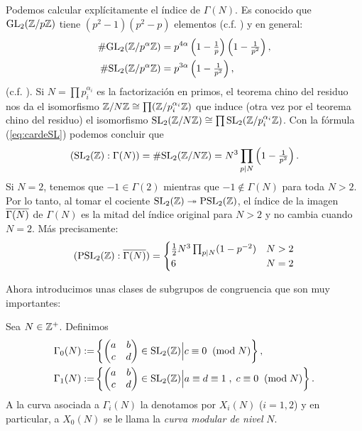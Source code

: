 \documentclass[../../tesis_maestria]{subfiles}
\begin{document}
Podemos calcular expl\'icitamente el \'indice de $\Gamma(N)$. Es conocido que $\mathrm{GL}_2(\mathbb{Z}/p\mathbb{Z})$
tiene $(p^2-1)(p^2-p)$ elementos (c.f. \cite[Teorema 8.5, pg 219]{RotmanAITTTOG}) y en general:
\begin{align}
  \#\mathrm{GL}_2(\mathbb{Z}/p^{\alpha}\mathbb{Z})&=p^{4\alpha}\left( 1-\tfrac{1}{p} \right)\left( 1-\tfrac{1}{p^2} \right),\nonumber\\
  \#\mathrm{SL}_2(\mathbb{Z}/p^{\alpha}\mathbb{Z})&=p^{3\alpha}\left( 1-\tfrac{1}{p^2} \right),\label{eq:cardeSL}
\end{align}
(c.f. \cite[\S1.6]{ShimuraITTATOAF}). Si $N=\prod p_i^{\alpha_i}$ es la factorizaci\'on en primos,
el teorema chino del residuo nos da el isomorfismo $\mathbb{Z}/N\mathbb{Z}\cong\prod (\mathbb{Z}/p_i^{\alpha_i}\mathbb{Z})$
que induce (otra vez por el teorema chino del residuo) el isomorfismo
$\mathrm{SL}_2(\mathbb{Z}/N\mathbb{Z})\cong\prod \mathrm{SL}_2(\mathbb{Z}/p_i^{\alpha_i}\mathbb{Z})$. Con la f\'ormula (\ref{eq:cardeSL})
podemos concluir que
\begin{equation}\label{eq:indiceGammaN}
  (\mathrm{SL}_2(\mathbb{Z}):\Gamma(N))=\#\mathrm{SL}_2(\mathbb{Z}/N\mathbb{Z})=N^3\prod_{p\mid N}\left( 1-\tfrac{1}{p^2} \right).
\end{equation}
Si $N=2$, tenemos que $-1\in\Gamma(2)$ mientras que $-1\not\in\Gamma(N)$ para toda $N>2$.
Por lo tanto, al tomar el cociente $\mathrm{SL}_2(\mathbb{Z})\twoheadrightarrow\mathrm{PSL}_2(\mathbb{Z})$, el \'indice de la imagen
$\overline{\Gamma(N)}$ de $\Gamma(N)$ es la mitad del \'indice original para $N>2$ y no cambia cuando
$N=2$. M\'as precisamente:
\[
  (\mathrm{PSL}_2(\mathbb{Z}):\overline{\Gamma(N)})=
  \begin{cases}
    \tfrac{1}{2}N^3\prod_{p\mid N}(1-p^{-2}) &N>2\\
    6 &N=2
  \end{cases}
\]

Ahora introducimos unas clases de subgrupos de congruencia que son muy importantes:

\begin{defin}
  Sea $N\in\mathbb{Z}^+$. Definimos
  \begin{align*}
    \Gamma_0(N):=&\left\{ \begin{pmatrix}a & b\\ c & d\end{pmatrix}\in\mathrm{SL}_2(\mathbb{Z})\Big| c\equiv 0\;\;(\mathrm{mod}\; N)\right\},\\
    \Gamma_1(N):=&
    \left\{ \begin{pmatrix}a & b\\ c & d\end{pmatrix}\in\mathrm{SL}_2(\mathbb{Z})\Big| a\equiv d\equiv1\;,\;c\equiv 0\;\;(\mathrm{mod}\; N)\right\}.
  \end{align*}
  A la curva asociada a $\Gamma_i(N)$ la denotamos por $X_i(N)$ ($i=1,2$) y en particular, a $X_0(N)$
  se le llama la \emph{curva modular de nivel} $N$. 
\end{defin}
\end{document}

